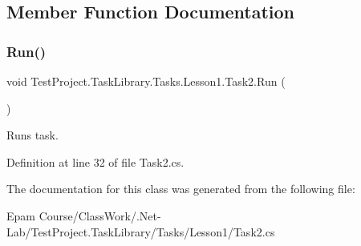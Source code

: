 \subsection{Member Function Documentation}
\mbox{\label{class_test_project_1_1_task_library_1_1_tasks_1_1_lesson1_1_1_task2_ad1a729069ea2544206e86b89a0db8efa}} 
\subsubsection{\texorpdfstring{Run()}{Run()}}
{\footnotesize\ttfamily void Test\+Project.\+Task\+Library.\+Tasks.\+Lesson1.\+Task2.\+Run (\begin{DoxyParamCaption}{ }\end{DoxyParamCaption})}



Runs task. 



Definition at line 32 of file Task2.\+cs.



The documentation for this class was generated from the following file\+:\begin{DoxyCompactItemize}
\item 
Epam Course/\+Class\+Work/.\+Net-\/\+Lab/\+Test\+Project.\+Task\+Library/\+Tasks/\+Lesson1/Task2.\+cs\end{DoxyCompactItemize}
